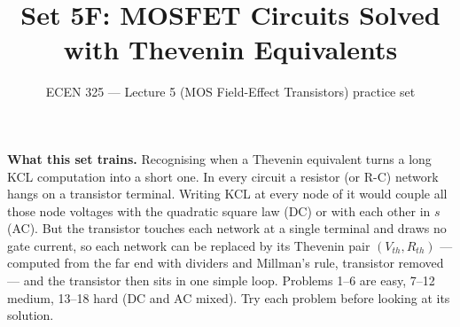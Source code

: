 \documentclass[11pt]{article}
\title{Set 5F: MOSFET Circuits Solved with Thevenin Equivalents}
\author{ECEN 325 --- Lecture 5 (MOS Field-Effect Transistors) practice set}
\date{}
\begin{document}
\maketitle

\textbf{What this set trains.} Recognising when a Thevenin equivalent turns a long KCL computation into a short one.
In every circuit a resistor (or R-C) network hangs on a transistor terminal. Writing KCL at every node of it would
couple all those node voltages with the quadratic square law (DC) or with each other in $s$ (AC). But the transistor
touches each network at a single terminal and draws no gate current, so each network can be replaced by its Thevenin
pair $(V_{th}, R_{th})$ --- computed from the far end with dividers and Millman's rule, transistor removed --- and the
transistor then sits in one simple loop. Problems 1--6 are easy, 7--12 medium, 13--18 hard (DC and AC mixed). Try
each problem before looking at its solution.
\end{document}
